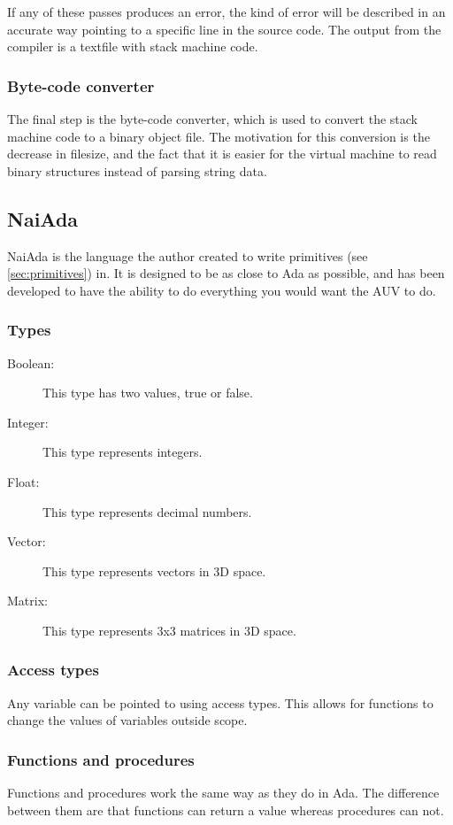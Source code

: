 If any of these passes produces an error, the kind of error will be described in an accurate way pointing to a specific line in the source code. The output from the compiler is a textfile with stack machine code.

\subsubsection{Byte-code converter}
The final step is the byte-code converter, which is used to convert the stack machine code to a binary object file. The motivation for this conversion is the decrease in filesize, and the fact that it is easier for the virtual machine to read binary structures instead of parsing string data.


\subsection{NaiAda}
\label{sec:naiada}
NaiAda is the language the author created to write primitives (see \cref{sec:primitives}) in. It is designed to be as close to Ada as possible, and has been developed to have the ability to do everything you would want the AUV to do.
\subsubsection{Types}
\begin{description}
\item[Boolean:] This type has two values, true or false.
\item[Integer:] This type represents integers.
\item[Float:] This type represents decimal numbers.
\item[Vector:] This type represents vectors in 3D space.
\item[Matrix:] This type represents 3x3 matrices in 3D space.
\end{description}

\subsubsection{Access types}
Any variable can be pointed to using access types. This allows for functions to change the values of variables outside scope.

\subsubsection{Functions and procedures}
Functions and procedures work the same way as they do in Ada. The difference between them are that functions can return a value whereas procedures can not.

